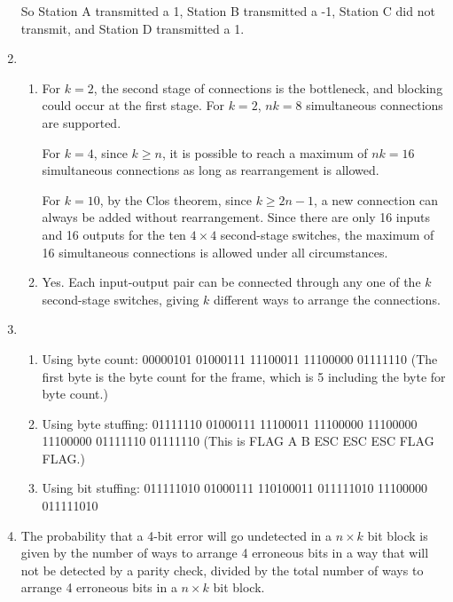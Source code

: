 \documentclass{article}
\begin{document}
\begin{enumerate}
So Station A transmitted a 1, Station B transmitted a -1, Station C did not transmit, and Station D transmitted a 1.

\item
\begin{enumerate}

\item For $k=2$, the second stage of connections is the bottleneck, and blocking could occur at the first stage. For $k=2$, $nk = 8$ simultaneous connections are supported.

For $k=4$, since $k \geq n$, it is possible to reach a maximum of $nk = 16$ simultaneous connections as long as rearrangement is allowed.

For $k=10$, by the Clos theorem, since $k \geq 2n-1$, a new connection can always be added without rearrangement. Since there are only 16 inputs and 16 outputs for the ten $4 \times 4$ second-stage switches, the maximum of 16 simultaneous connections is allowed under all circumstances.

\item Yes. Each input-output pair can be connected through any one of the $k$ second-stage switches, giving $k$ different ways to arrange the connections.

\end{enumerate}

\item
\begin{enumerate}

\item Using byte count:  00000101 01000111 11100011 11100000 01111110 (The first byte is the byte count for the frame, which is 5 including the byte for byte count.)

\item Using byte stuffing: 01111110 01000111 11100011 11100000 11100000 11100000 01111110 01111110
(This is FLAG A B ESC ESC ESC FLAG FLAG.) 

\item Using bit stuffing: 011111010 01000111 110100011 011111010 11100000 011111010

\end{enumerate}

\item The probability that a 4-bit error will go undetected in a $n \times k$ bit block is given by the number of ways to arrange 4 erroneous bits in a way that will not be detected by a parity check, divided by the total number of ways to arrange 4 erroneous bits in a $n \times k$ bit block. \\


\end{enumerate}
\end{document}
